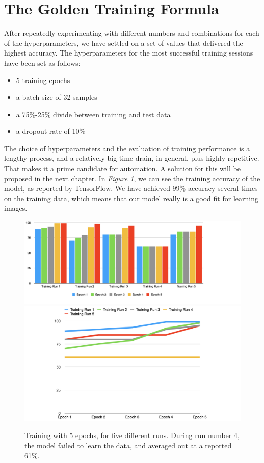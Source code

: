 \section{The Golden Training Formula}
After repeatedly experimenting with different numbers and combinations for each of the hyperparameters, we have settled on a set of values that delivered the highest accuracy. The hyperparameters for the most successful training sessions have been set as follows: 
\begin{itemize}
    \item 5 training epochs
    \item a batch size of 32 samples
    \item a 75\%-25\% divide between training and test data
    \item a dropout rate of 10\%
\end{itemize}
The choice of hyperparameters and the evaluation of training performance is a lengthy process, and a relatively big time drain, in general, plus highly repetitive. That makes it a prime candidate for automation. A solution for this will be proposed in the next chapter. In \textit{Figure \ref{training_tf_gold}}, we can see the training accuracy of the model, as reported by TensorFlow. We have achieved 99\% accuracy several times on the training data, which means that our model really is a good fit for learning images. 

\begin{figure}
    \centering
    \includegraphics[width = 16 cm]{figures/training_fig1}
    \includegraphics[width = 16 cm]{figures/training_fig2}
    \caption{Training with 5 epochs, for five different runs. During run number 4, the model failed to learn the data, and averaged out at a reported 61\%.}
    \label{training_tf_gold}
\end{figure}


